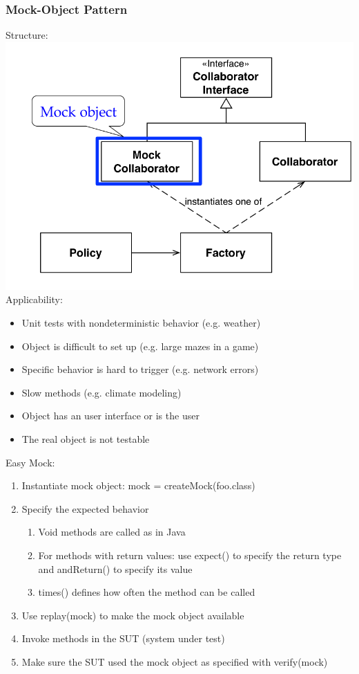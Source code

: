 \subsubsection{Mock-Object Pattern}
Structure:\\
\includegraphics[width=.75\linewidth]{images/testing_pattern_mock_object.png}\\
Applicability:
\begin{itemize}
  \item Unit tests with nondeterministic behavior (e.g. weather)
  \item Object is difficult to set up (e.g. large mazes in a game)
  \item Specific behavior is hard to trigger (e.g. network errors)
  \item Slow methods (e.g. climate modeling)
  \item Object has an user interface or is the user
  \item The real object is not testable
\end{itemize}
Easy Mock:
\begin{enumerate}
  \item Instantiate mock object: mock = createMock(foo.class)
  \item Specify the expected behavior
  \begin{enumerate}
    \item Void methods are called as in Java
    \item For methods with return values: use expect() to specify the return type and andReturn() to specify its value
    \item times() defines how often the method can be called
  \end{enumerate}
  \item Use replay(mock) to make the mock object available
  \item Invoke methods in the SUT (system under test)
  \item Make sure the SUT used the mock object as specified with verify(mock)
\end{enumerate}
\newpage
